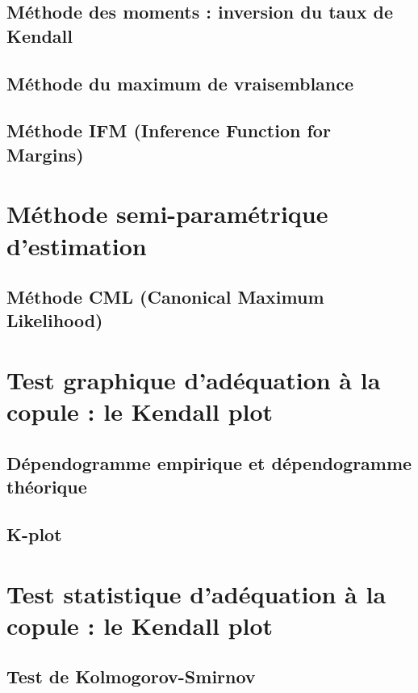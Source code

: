 \subsection{Méthode des moments : inversion du taux de Kendall}

\subsection{Méthode du maximum de vraisemblance}

\subsection{Méthode IFM (Inference Function for Margins)}


\section{Méthode semi-paramétrique d'estimation}

\subsection{Méthode CML (Canonical Maximum Likelihood)}


\section{Test graphique d'adéquation à la copule : le Kendall plot}

\subsection{Dépendogramme empirique et dépendogramme théorique}

\subsection{K-plot}

\section{Test statistique d'adéquation à la copule : le Kendall plot}

\subsection{Test de Kolmogorov-Smirnov}

